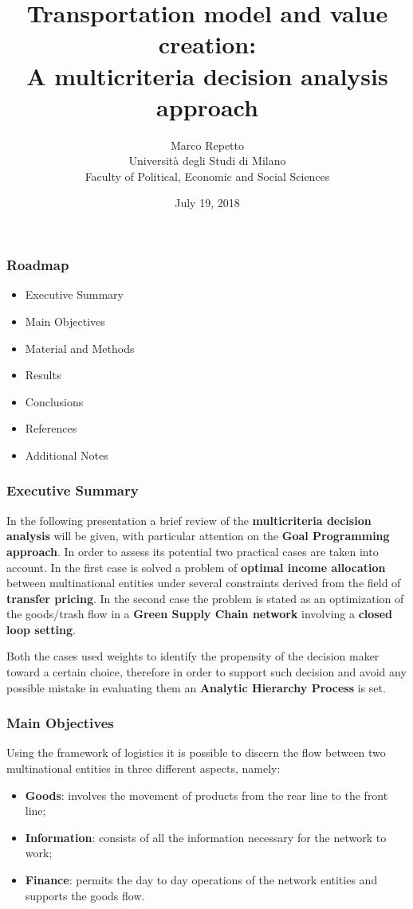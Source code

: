 \documentclass{beamer}
\title{Transportation model and value creation:\\
\large A multicriteria decision analysis approach}
\date{July 19, 2018}
\author{Marco Repetto\\
Università degli Studi di Milano\\
\small Faculty of Political, Economic and Social Sciences}
\begin{document}
\maketitle

\begin{frame}
	\frametitle{Roadmap}
	\begin{itemize}
\item Executive Summary
\item Main Objectives
\item Material and Methods
\item Results
\item Conclusions
\item References
\item Additional Notes
\end{itemize}
\end{frame}

\begin{frame}
	\frametitle{Executive Summary}
	\justifying
	In the following presentation a brief review of the \textbf{multicriteria decision analysis}\cite{Greco2016} will be given, with particular attention on the \textbf{Goal Programming approach}\cite{Charnes1955}. In order to assess its potential two practical cases are taken into account. In the first case is solved a problem of \textbf{optimal income allocation} between multinational entities under several constraints derived from the field of \textbf{transfer pricing}\cite{TPguide2017}. In the second case the problem is stated as an optimization of the goods/trash flow in a \textbf{Green Supply Chain network} involving a \textbf{closed loop setting}\cite{Zarandi2011}.

	Both the cases used weights to identify the propensity of the decision maker toward a certain choice, therefore in order to support such decision and avoid any possible mistake in evaluating them an \textbf{Analytic Hierarchy Process}\cite{Saaty1980} is set.


\end{frame}

\begin{frame}
	\frametitle{Main Objectives}
	\justifying
	Using the framework of logistics it is possible to discern the flow between two multinational entities in three different aspects, namely:

\begin{itemize}
	\item \textbf{Goods}: involves the movement of products from the rear line to the front line;    
	\item \textbf{Information}: consists of all the information necessary for the network to work;
	\item \textbf{Finance}: permits the day to day operations of the network entities and supports the goods flow. 
\end{itemize}

\end{frame}
\end{document}
